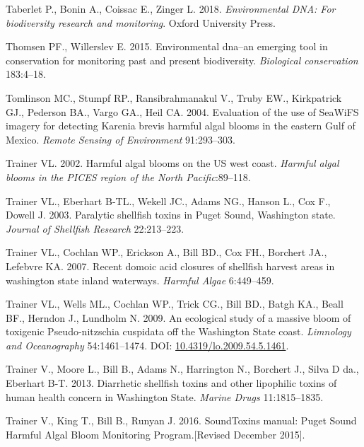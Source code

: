 \documentclass[
]{article}
\begin{document}
\leavevmode\hypertarget{ref-taberlet2018environmental}{}%
Taberlet P., Bonin A., Coissac E., Zinger L. 2018. \emph{Environmental
DNA: For biodiversity research and monitoring}. Oxford University Press.

\leavevmode\hypertarget{ref-thomsen2015environmental}{}%
Thomsen PF., Willerslev E. 2015. Environmental dna--an emerging tool in
conservation for monitoring past and present biodiversity.
\emph{Biological conservation} 183:4--18.

\leavevmode\hypertarget{ref-tomlinson2004}{}%
Tomlinson MC., Stumpf RP., Ransibrahmanakul V., Truby EW., Kirkpatrick
GJ., Pederson BA., Vargo GA., Heil CA. 2004. Evaluation of the use of
SeaWiFS imagery for detecting Karenia brevis harmful algal blooms in the
eastern Gulf of Mexico. \emph{Remote Sensing of Environment}
91:293--303.

\leavevmode\hypertarget{ref-trainer2002harmful}{}%
Trainer VL. 2002. Harmful algal blooms on the US west coast.
\emph{Harmful algal blooms in the PICES region of the North
Pacific}:89--118.

\leavevmode\hypertarget{ref-trainer2003paralytic}{}%
Trainer VL., Eberhart B-TL., Wekell JC., Adams NG., Hanson L., Cox F.,
Dowell J. 2003. Paralytic shellfish toxins in Puget Sound, Washington
state. \emph{Journal of Shellfish Research} 22:213--223.

\leavevmode\hypertarget{ref-trainer2007recent}{}%
Trainer VL., Cochlan WP., Erickson A., Bill BD., Cox FH., Borchert JA.,
Lefebvre KA. 2007. Recent domoic acid closures of shellfish harvest
areas in washington state inland waterways. \emph{Harmful Algae}
6:449--459.

\leavevmode\hypertarget{ref-Trainer2009}{}%
Trainer VL., Wells ML., Cochlan WP., Trick CG., Bill BD., Batgh KA.,
Beall BF., Herndon J., Lundholm N. 2009. An ecological study of a
massive bloom of toxigenic Pseudo-nitzschia cuspidata off the Washington
State coast. \emph{Limnology and Oceanography} 54:1461--1474. DOI:
\href{https://doi.org/10.4319/lo.2009.54.5.1461}{10.4319/lo.2009.54.5.1461}.

\leavevmode\hypertarget{ref-trainer2013diarrhetic}{}%
Trainer V., Moore L., Bill B., Adams N., Harrington N., Borchert J.,
Silva D da., Eberhart B-T. 2013. Diarrhetic shellfish toxins and other
lipophilic toxins of human health concern in Washington State.
\emph{Marine Drugs} 11:1815--1835.

\leavevmode\hypertarget{ref-trainer2016soundtoxins}{}%
Trainer V., King T., Bill B., Runyan J. 2016. SoundToxins manual: Puget
Sound Harmful Algal Bloom Monitoring Program.{[}Revised December
2015{]}.
\end{document}
